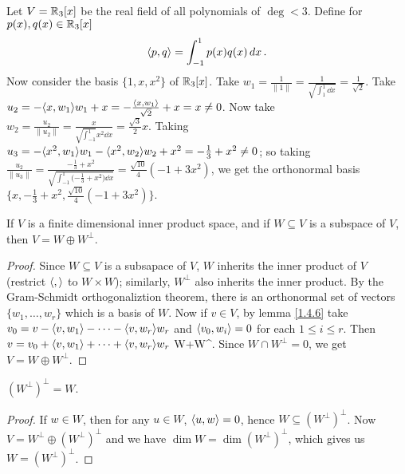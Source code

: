 \begin{example}
    Let $V=\mathbb{R}_3[x]$ be the real field of all polynomials of $\deg<3$. Define for
    $p(x),q(x) \in \mathbb{R}_3[x]$
        \begin{equation*}
            \langle p,q\rangle=\int_{-1}^1{p(x)q(x)} \dd{x}.
        \end{equation*}
    Now consider the basis $\{1,x,x^2\}$ of $\mathbb{R}_3[x]$. Take
    $w_1=\frac{1}{\|1\|}=\frac{1}{\sqrt{\int_{1}^1 \dd{x}}}=\frac{1}{\sqrt{2}}$. Take
    $u_2=-\langle x,w_1\rangle w_1+x=-\frac{\langle x,w_1\rangle}{\sqrt{2}}+x=x \neq 0$. Now take
    $w_2=\frac{u_2}{\|u_2\|}=\frac{x}{\sqrt{\int_{-1}^1}{x^2} \dd{x}}=\frac{\sqrt{3}}{2}x$. Taking
    $u_3=-\langle x^2,w_1\rangle w_1-\langle x^2,w_2\rangle w_2+x^2=-\frac{1}{3}+x^2 \neq 0$; so taking
    $\frac{u_2}{\|u_3\|}=\frac{-\frac{1}{3}+x^2}{\sqrt{\int_{-1}^1{(-\frac{1}{3}+x^2})
    \dd{x}}}=\frac{\sqrt{10}}{4}(-1+3x^2)$, we get the orthonormal basis
    $\{x,-\frac{1}{3}+x^2,\frac{\sqrt{10}}{4}(-1+3x^2)\}$.
\end{example} 

\begin{theorem}\label{1.4.8}
    If $V$ is a finite dimensional inner product space, and if  $W \subseteq V$ is a subspace of
    $V$, then  $V=W \oplus W^\perp$.
\end{theorem}
\begin{proof}
    Since $W \subseteq V$ is a subsapace of  $V$,  $W$ inherits the inner product of  $V$ (restrict
    $\langle ,\rangle$ to $W \times W$); similarly, $W^\perp$ also inherits the inner product. By the
    Gram-Schmidt orthogonaliztion theorem, there is an orthonormal set of vectors $\{w_1, \dots,
    w_r\}$ which is a basis of $W$. Now if  $v \in V$, by lemma \ref {1.4.6} take
    $v_0=v-\langle v,w_1\rangle-\dots-\langle v,w_r\rangle w_r$ and $\langle v_0,w_i\rangle=0$ for each $1 \leq i \leq
    r$. Then  $v=v_0+\langle v,w_1\rangle+\dots+\langle v,w_r\rangle w_r$ \in W+W^\perp. Since $W \cap
    W^\perp=0$, we get  $V=W \oplus W^\perp$.
\end{proof}
\begin{corollary}
    $(W^\perp)^\perp=W$.
\end{corollary}
\begin{proof}
    If $w \in W$, then for any  $u \in W$,  $\langle u,w\rangle=0$, hence $W \subseteq (W^\perp)^\perp$.
    Now $V=W^\perp \oplus (W^\perp)^\perp$ and we have $\dim{W}=\dim{(W^\perp)^\perp}$, which gives
    us $W=(W^\perp)^\perp$.
\end{proof}
